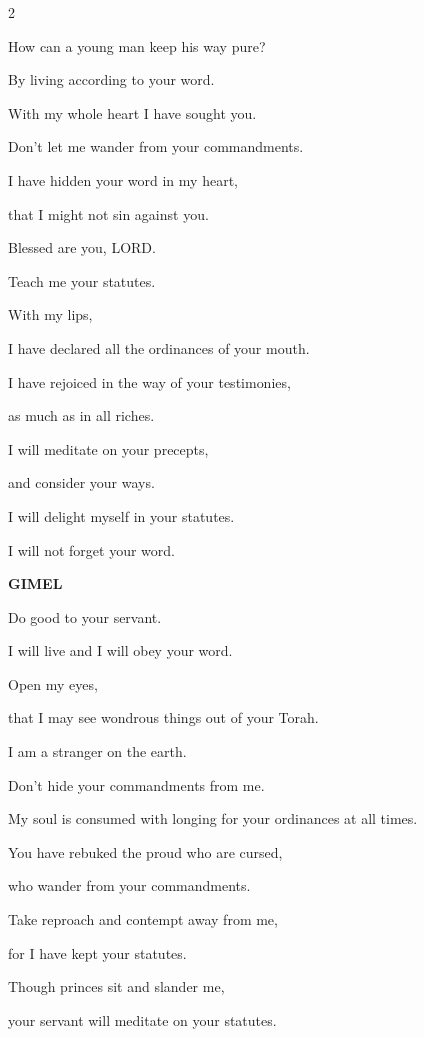 \begin{multicols}{2}
	
	\myverse{}How can a young man keep his way pure?
	
	By living according to your word.
	
	
	\myverse{}With my whole heart I have sought you.
	
	Don’t let me wander from your commandments.
	
	
	\myverse{}I have hidden your word in my heart,
	
	that I might not sin against you.
	
	
	\myverse{}Blessed are you, LORD.
	
	Teach me your statutes.
	
	
	\myverse{}With my lips,
	
	I have declared all the ordinances of your mouth.
	
	
	\myverse{}I have rejoiced in the way of your testimonies,
	
	as much as in all riches.
	
	
	\myverse{}I will meditate on your precepts,
	
	and consider your ways.
	
	
	\myverse{}I will delight myself in your statutes.
	
	I will not forget your word.
	
	\vspace{\baselineskip}
	
	\textbf{GIMEL}
	
	
	\myverse{}Do good to your servant.
	
	I will live and I will obey your word.
	
	
	\myverse{}Open my eyes,
	
	that I may see wondrous things out of your Torah.
	
	
	\myverse{}I am a stranger on the earth.
	
	Don’t hide your commandments from me.
	
	
	\myverse{}My soul is consumed with longing for your ordinances at all
	times.
	
	
	\myverse{}You have rebuked the proud who are cursed,
	
	who wander from your commandments.
	
	
	\myverse{}Take reproach and contempt away from me,
	
	for I have kept your statutes.
	
	
	\myverse{}Though princes sit and slander me,
	
	your servant will meditate on your statutes.
	

\end{multicols}
